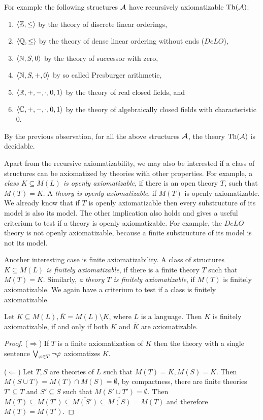 For example the following structures $\mathcal{A}$ have recursively axiomatizable $\operatorname{Th}(\mathcal{A})$:
\begin{enumerate}
  \item $\langle \mathbb{Z}, \leq \rangle$ by the theory of discrete linear orderings, 
  \item $\langle \mathbb{Q}, \leq \rangle$ by the theory of dense linear ordering without ends ($DeLO$),
  \item $\langle \mathbb{N}, S, 0 \rangle$ by the theory of successor with zero, 
  \item $\langle \mathbb{N}, S, +, 0 \rangle$ by so called Presburger arithmetic, 
  \item $\langle {\ensuremath{\mathbb{R}}}, +, -, \cdot, 0, 1 \rangle$ by the theory of real closed fields, and 
  \item $\langle \mathbb{C}, +, -, \cdot, 0, 1 \rangle$ by the theory of algebraically closed fields with characteristic 0.
\end{enumerate}
By the previous observation, for all the above structures $\mathcal{A}$, the theory $\operatorname{Th}(\mathcal{A})$ is decidable.

Apart from the recursive axiomatizability, we may also be interested if a class of structures can be axiomatized by theories with other properties. For example, a \emph{class $K \subseteq M(L)$ is openly axiomatizable}, if there is an open theory $T$, such that $M(T) = K$. A \emph{theory is openly axiomatizable}, if $M(T)$ is openly axiomatizable. We already know that if $T$ is openly axiomatizable then every substructure of its model is also its model. The other implication also holds and gives a useful criterium to test if a theory is openly axiomatizable. For example, the $DeLO$ theory is not openly axiomatizable, because a finite substructure of its model is not its model.

Another interesting case is finite axiomatizability. A class of structures \emph{$K \subseteq M(L)$ is finitely axiomatizable}, if there is a finite theory $T$ such that $M(T) = K$. Similarly, \emph{a theory $T$ is finitely axiomatizable}, if $M(T)$ is finitely axiomatizable. We again have a criterium to test if a class is finitely axiomatizable.

\begin{theorem}
Let $K \subseteq M(L), \bar{K} = M(L) \setminus K$, where $L$ is a language. Then $K$ is finitely axiomatizable, if and only if both $K$ and $\bar{K}$ are axiomatizable.
\end{theorem}
\begin{proof}
($\Rightarrow$) If $T$ is a finite axiomatization of $K$ then the theory with a single sentence $\bigvee_{\varphi \in T} \neg \varphi$ axiomatizes $K$.

($\Leftarrow$) Let $T, S$ are theories of $L$ such that $M(T) = K, M(S) = \bar{K}$. Then $M(S \cup T) = M(T) \cap M(S) = \emptyset$, by compactness, there are finite theories $T' \subseteq T$ and $S' \subseteq S$ such that $M(S' \cup T') = \emptyset$. Then $M(T) \subseteq M(T') \subseteq \overline{M(S')} \subseteq \overline{M(S)}=M(T)$ and therefore $M(T) = M(T')$.
\end{proof}



